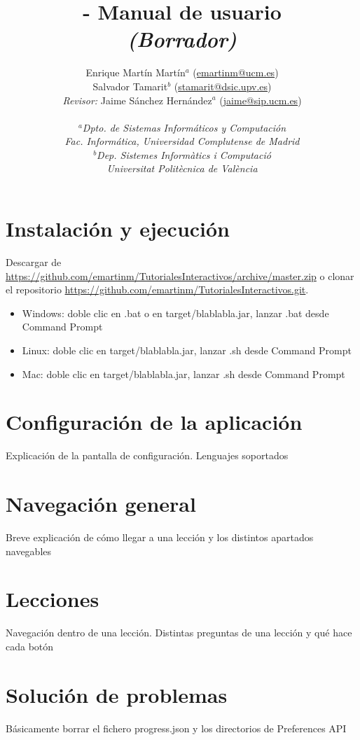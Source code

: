 \documentclass[]{article}
\title{\toolname{} - Manual de usuario \\ \emph{(Borrador)}}
\author{Enrique Martín Martín$^a$ (\url{emartinm@ucm.es}) \\ 
	Salvador Tamarit$^b$ (\url{stamarit@dsic.upv.es}) \\
	\emph{Revisor:} Jaime Sánchez Hernández$^a$ (\url{jaime@sip.ucm.es}) \\~\\[-.4cm]
	\normalsize{\emph{$^a$Dpto. de Sistemas Informáticos y Computación}}\\[-0.1cm]
	\normalsize{\emph{Fac. Informática, Universidad Complutense de Madrid}}\\[-0.1cm]
	\normalsize{\emph{$^b$Dep. Sistemes Informàtics i Computació}}\\[-0.1cm]
	\normalsize{\emph{Universitat Politècnica de València}}\\[-0.1cm]
}
\begin{document}
\maketitle

\tableofcontents

\clearpage

\section{Instalación y ejecución}

Descargar de \url{https://github.com/emartinm/TutorialesInteractivos/archive/master.zip} o clonar el repositorio \url{https://github.com/emartinm/TutorialesInteractivos.git}.

\begin{itemize}
	\item Windows: doble clic en .bat o en target/blablabla.jar, lanzar .bat desde Command Prompt
	\item Linux: doble clic en target/blablabla.jar, lanzar .sh desde Command Prompt
	\item Mac: doble clic en target/blablabla.jar, lanzar .sh desde Command Prompt
\end{itemize}

\section{Configuración de la aplicación}
Explicación de la pantalla de configuración. Lenguajes soportados

\section{Navegación general}
Breve explicación de cómo llegar a una lección y los distintos apartados navegables

\section{Lecciones}
Navegación dentro de una lección. Distintas preguntas de una lección y qué hace cada botón

\section{Solución de problemas}
Básicamente borrar el fichero progress.json y los directorios de Preferences API
\end{document}
